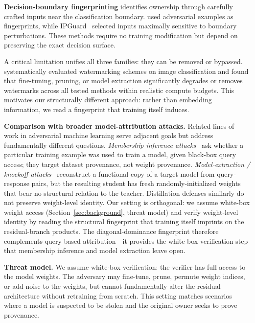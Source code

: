 \documentclass[wcp]{jmlr}
\begin{document}
\textbf{Decision-boundary fingerprinting} identifies ownership through carefully crafted inputs near the classification boundary. \citet{le2020adversarial} used adversarial examples as fingerprints, while IPGuard~\citep{cao2021ipguard} selected inputs maximally sensitive to boundary perturbations. These methods require no training modification but depend on preserving the exact decision surface.

A critical limitation unifies all three families: they can be removed or bypassed. \citet{lukas2022sok} systematically evaluated watermarking schemes on image classification and found that fine-tuning, pruning, or model extraction significantly degrades or removes watermarks across all tested methods within realistic compute budgets. This motivates our structurally different approach: rather than embedding information, we read a fingerprint that training itself induces.

\textbf{Comparison with broader model-attribution attacks.} Related lines of work in adversarial machine learning serve adjacent goals but address fundamentally different questions. \emph{Membership inference attacks}~\citep{shokri2017membership} ask whether a particular training example was used to train a model, given black-box query access; they target dataset provenance, not weight provenance. \emph{Model-extraction / knockoff attacks}~\citep{tramer2016stealing, orekondy2019knockoff} reconstruct a functional copy of a target model from query-response pairs, but the resulting student has fresh randomly-initialized weights that bear no structural relation to the teacher. Distillation defenses similarly do not preserve weight-level identity. Our setting is orthogonal: we assume white-box weight access (Section~\ref{sec:background}, threat model) and verify weight-level identity by reading the structural fingerprint that training itself imprints on the residual-branch products. The diagonal-dominance fingerprint therefore complements query-based attribution---it provides the white-box verification step that membership inference and model extraction leave open.

\textbf{Threat model.} We assume white-box verification: the verifier has full access to the model weights. The adversary may fine-tune, prune, permute weight indices, or add noise to the weights, but cannot fundamentally alter the residual architecture without retraining from scratch. This setting matches scenarios where a model is suspected to be stolen and the original owner seeks to prove provenance.
\end{document}
